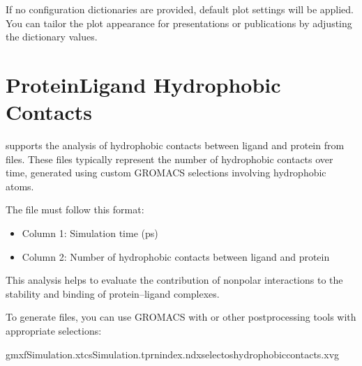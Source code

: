 \documentclass[a4paper,10pt,english]{sphinxmanual}
\begin{document}
\begin{sphinxVerbatim}[commandchars=\\\{\}]
 
\end{sphinxVerbatim}

\sphinxAtStartPar
If no configuration dictionaries are provided, default plot settings will be applied. You can tailor the plot appearance for presentations or publications by adjusting the dictionary values.


\section{Protein\sphinxhyphen{}Ligand Hydrophobic Contacts}
\label{\detokenize{Input:protein-ligand-hydrophobic-contacts}}
\sphinxAtStartPar
{} supports the analysis of hydrophobic contacts between ligand and protein from  files. These files typically represent the number of hydrophobic contacts over time, generated using custom GROMACS selections involving hydrophobic atoms.

\sphinxAtStartPar
The  file must follow this format:
\begin{itemize}
\item {} 
\sphinxAtStartPar
Column 1: Simulation time (ps)

\item {} 
\sphinxAtStartPar
Column 2: Number of hydrophobic contacts between ligand and protein

\end{itemize}

\sphinxAtStartPar
This analysis helps to evaluate the contribution of nonpolar interactions to the stability and binding of protein–ligand complexes.

\sphinxAtStartPar
To generate  files, you can use GROMACS with  or other post\sphinxhyphen{}processing tools with appropriate selections:

\begin{sphinxVerbatim}[commandchars=\\\{\}]
gmx\PYGZhy{}fSimulation.xtc\PYGZhy{}sSimulation.tpr\PYGZhy{}nindex.ndx\PYGZhy{}select\PYGZhy{}oshydrophobic\PYGZus{}contacts.xvg
\end{sphinxVerbatim}
\end{document}
